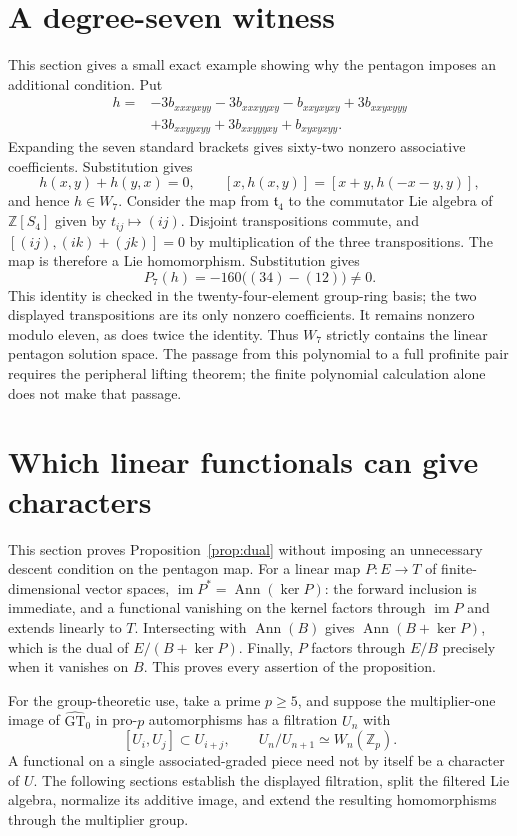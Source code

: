 \documentclass[11pt]{article}
\newcommand{\GTz}{\widehat{\mathrm{GT}}_0}
\newcommand{\Z}{\mathbb Z}
\newcommand{\Ann}{\operatorname{Ann}}
\newcommand{\im}{\operatorname{im}}
\theoremstyle{definition}
\theoremstyle{remark}
\begin{document}
\section{A degree-seven witness}\label{sec:seven}
This section gives a small exact example showing why the pentagon imposes
an additional condition.  Put
\begin{align*}
h={}&-3b_{xxxyxyy}-3b_{xxxyyxy}-b_{xxyxyxy}
       +3b_{xxyxyyy}\\
 &+3b_{xxyyxyy}+3b_{xxyyyxy}+b_{xyxyxyy}.
\end{align*}
Expanding the seven standard brackets gives sixty-two nonzero associative
coefficients.  Substitution gives
\[
h(x,y)+h(y,x)=0,\qquad
[x,h(x,y)]=[x+y,h(-x-y,y)],
\]
and hence $h\in W_7$.  Consider the map from $\mathfrak t_4$ to the
commutator Lie algebra of $\Z[S_4]$ given by $t_{ij}\mapsto(ij)$.
Disjoint transpositions commute, and
$[(ij),(ik)+(jk)]=0$ by multiplication of the three transpositions.
The map is therefore a Lie homomorphism.  Substitution gives
\begin{equation}
 P_7(h)=-160\bigl((34)-(12)\bigr)\ne0.
 \label{eq:seven}
\end{equation}
This identity is checked in the twenty-four-element group-ring basis;
the two displayed transpositions are its only nonzero coefficients.
It remains nonzero modulo eleven, as does twice the identity.
Thus $W_7$ strictly contains the linear pentagon solution space.
The passage from this polynomial to a full profinite pair requires the
peripheral lifting theorem; the finite polynomial calculation alone does
not make that passage.

\section{Which linear functionals can give characters}\label{sec:linear}
This section proves Proposition~\ref{prop:dual} without imposing an
unnecessary descent condition on the pentagon map.
For a linear map $P:E\to T$ of finite-dimensional vector spaces,
$\im P^*=\Ann(\ker P)$: the forward inclusion is immediate, and a
functional vanishing on the kernel factors through $\im P$ and extends
linearly to $T$.  Intersecting with $\Ann(B)$ gives
$\Ann(B+\ker P)$, which is the dual of $E/(B+\ker P)$.
Finally, $P$ factors through $E/B$ precisely when it vanishes on $B$.
This proves every assertion of the proposition.

For the group-theoretic use, take a prime $p\geq5$, and suppose the
multiplier-one image of $\GTz$ in pro-$p$ automorphisms has a filtration
$U_n$ with
\[
[U_i,U_j]\subset U_{i+j},\qquad U_n/U_{n+1}\simeq W_n(\Z_p).
\]
A functional on a single associated-graded piece need not by itself be a
character of $U$.  The following sections establish the displayed
filtration, split the filtered Lie algebra, normalize its additive image,
and extend the resulting homomorphisms through the multiplier group.
\end{document}

